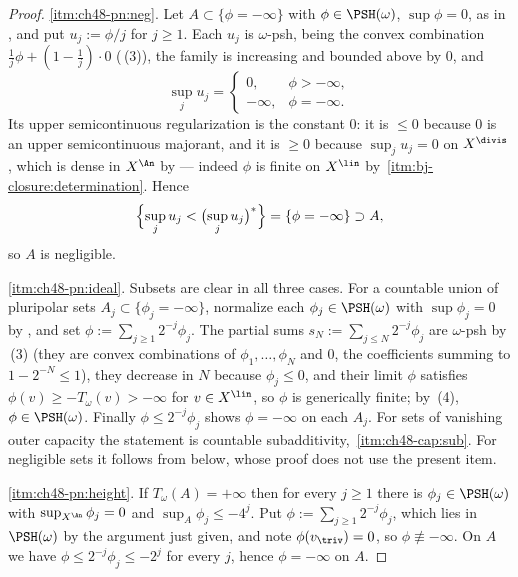 \begin{proof}
\cref{itm:ch48-pn:neg}.  Let $A\subset\{\phi=-\infty\}$ with
$\phi\in\PSH(\omega)$, $\sup\phi=0$, as in
, and put $u_j:=\phi/j$ for $j\ge1$.
Each $u_j$ is $\omega$-psh, being the convex combination
$\tfrac1j\phi+(1-\tfrac1j)\cdot0$
(\,(3)), the family is increasing and bounded
above by $0$, and
\[
 \sup_ju_j=\begin{cases}0,&\phi>-\infty,\\ -\infty,&\phi=-\infty.\end{cases}
\]
Its upper semicontinuous regularization is the constant $0$: it is
$\le0$ because $0$ is an upper semicontinuous majorant, and it is
$\ge0$ because $\sup_ju_j=0$ on $X^{\divis}$, which is dense in
$X^{\An}$ by  --- indeed
$\phi$ is finite on $X^{\lin}$ by
\,\cref{itm:bj-closure:determination}.  Hence
\[
 \Bigl\{\sup_ju_j<\bigl(\sup_ju_j\bigr)^*\Bigr\}
 =\{\phi=-\infty\}\supset A ,
\]
so $A$ is negligible.

\cref{itm:ch48-pn:ideal}.  Subsets are clear in all three cases.  For a
countable union of pluripolar sets $A_j\subset\{\phi_j=-\infty\}$,
normalize each $\phi_j\in\PSH(\omega)$ with $\sup\phi_j=0$ by
, and set
$\phi:=\sum_{j\ge1}2^{-j}\phi_j$.  The partial sums
$s_N:=\sum_{j\le N}2^{-j}\phi_j$ are $\omega$-psh by
\,(3) (they are convex combinations of
$\phi_1,\dots,\phi_N$ and $0$, the coefficients summing to
$1-2^{-N}\le1$), they decrease in $N$ because $\phi_j\le0$, and their
limit $\phi$ satisfies $\phi(v)\ge-T_\omega(v)>-\infty$ for
$v\in X^{\lin}$, so $\phi$ is generically finite; by
\,(4), $\phi\in\PSH(\omega)$.  Finally
$\phi\le2^{-j}\phi_j$ shows $\phi=-\infty$ on each $A_j$.  For sets
of vanishing outer capacity the statement is countable subadditivity,
\,\cref{itm:ch48-cap:sub}.  For
negligible sets it follows from  below,
whose proof does not use the present item.

\cref{itm:ch48-pn:height}.  If $T_\omega(A)=+\infty$ then for every
$j\ge1$ there is $\phi_j\in\PSH(\omega)$ with
$\sup_{X^{\An}}\phi_j=0$ and $\sup_A\phi_j\le-4^j$.  Put
$\phi:=\sum_{j\ge1}2^{-j}\phi_j$, which lies in $\PSH(\omega)$ by the
argument just given, and note $\phi(v_{\triv})=0$, so
$\phi\not\equiv-\infty$.  On $A$ we have
$\phi\le2^{-j}\phi_j\le-2^j$ for every $j$, hence $\phi=-\infty$ on
$A$.
\end{proof}

